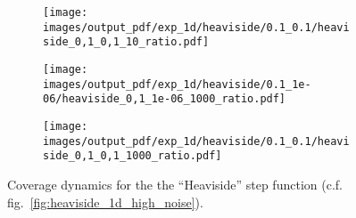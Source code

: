 \documentclass[a4paper,14pt]{extarticle}
\begin{document}
\begin{figure}
\begin{subfigure}[b]{0.25\linewidth}
    \caption{} \label{fig:heaviside_1d_high_noise_arb_c1}
  \end{subfigure}%
  \begin{subfigure}[b]{0.25\linewidth}
    \texttt{[image: images/output\_pdf/exp\_1d/heaviside/0.1\_0.1/heaviside\_0,1\_0,1\_10\_ratio.pdf]}
    \caption{} \label{fig:heaviside_1d_high_noise_arb_c2}
  \end{subfigure}%
  \begin{subfigure}[b]{0.25\linewidth}
    \texttt{[image: images/output\_pdf/exp\_1d/heaviside/0.1\_1e-06/heaviside\_0,1\_1e-06\_1000\_ratio.pdf]}
    \caption{} \label{fig:heaviside_1d_high_noise_arb_c3}
  \end{subfigure}%
  \begin{subfigure}[b]{0.25\linewidth}
    \texttt{[image: images/output\_pdf/exp\_1d/heaviside/0.1\_0.1/heaviside\_0,1\_0,1\_1000\_ratio.pdf]}
    \caption{} \label{fig:heaviside_1d_high_noise_arb_c4}
  \end{subfigure}%
  \caption{Coverage dynamics for the the ``Heaviside'' step function (c.f. fig.~\ref{fig:heaviside_1d_high_noise}).}
  \label{fig:heaviside_1d_high_noise_arb}
\end{figure}
\end{document}
